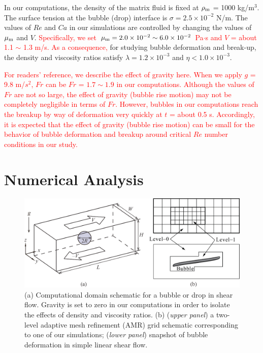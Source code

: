 \documentclass{elsarticle}
\begin{document}
In our computations, the density of the matrix fluid is fixed at $\rho_{\rm m}$
= 1000 kg/m$^3$.  The surface tension at the bubble (drop) interface is $\sigma
=2.5 \times 10^{-2}$ N/m. The values of $Re$ and $Ca$ in our simulations are
controlled by changing the values of $\mu_{\rm m}$ and $V$. 
\textcolor{red}
{
Specifically, we set $\mu_{\rm m} = 2.0 \times 10^{-2} \sim 6.0 \times 10^{-2}$ Pa$\cdot$s and
$V$ = about 1.1 $\sim$ 1.3 m/s.
As a consequence, 
}
for studying bubble deformation and break-up, the density and viscosity ratios satisfy
$\lambda = 1.2 \times 10^{-3}$ and $\eta < 1.0 \times 10^{-3}$.

\textcolor{red}
{
For readers’ reference, we describe the effect of gravity here. When we apply $g$ = 9.8 m/$s^{2}$,  $Fr$  can be $Fr$ = $1.7 \sim 1.9$ in our computations.
Although the values of $Fr$ are not so large, the effect of gravity (bubble rise motion) may not be completely negligible in terms of $Fr$.
However, bubbles in our computations reach the breakup by way of deformation very quickly at $t$ = about 0.5 s. 
Accordingly, it is expected that the effect of gravity (bubble rise motion) can be small for the behavior of bubble deformation and breakup 
around critical $Re$ number conditions in our study.
}
\section{Numerical Analysis}
% 
\begin{figure}%
  \centering
  \includegraphics[scale=0.4]{Figure/1-SchematicAndGrid}
  \caption{(a) Computational domain schematic for a bubble or drop in shear 
           flow.  Gravity is set to zero in our computations in order to isolate
           the effects of density and viscosity ratios.  
           (b) (\textit{upper panel}) a two-level adaptive mesh 
           refinement (AMR) grid schematic corresponding to one of our
           simulations;
           (\textit{lower panel}) snapshot of bubble deformation 
           in simple linear shear flow.}
  \label{fig:SchemAndGrid}
\end{figure}
%
\end{document}
